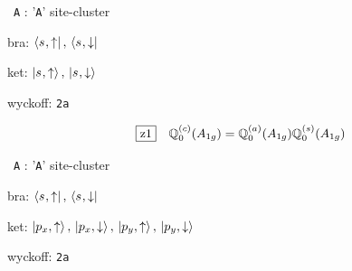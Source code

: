 \documentclass[fleqn,10pt,landscape]{jsarticle}
\begin{document}
\vspace{5mm}

\noindent\textbullet\, \texttt{A} : '\texttt{A}' site-cluster

\noindent\quad * bra: $\bra{s_{},\uparrow},\, \bra{s_{},\downarrow}$

\noindent\quad * ket: $\ket{s_{},\uparrow},\, \ket{s_{},\downarrow}$

\noindent\quad * wyckoff: \texttt{2a}

\begin{dmath*}
\hspace*{3mm}\fbox{z1}\quad \mathbb{Q}_{0}^{(c)}(A_{1g})=\mathbb{Q}_{0}^{(a)}(A_{1g}) \mathbb{Q}_{0}^{(s)}(A_{1g})
\end{dmath*}
\vspace{5mm}

\noindent\textbullet\, \texttt{A} : '\texttt{A}' site-cluster

\noindent\quad * bra: $\bra{s_{},\uparrow},\, \bra{s_{},\downarrow}$

\noindent\quad * ket: $\ket{p_{x},\uparrow},\, \ket{p_{x},\downarrow},\, \ket{p_{y},\uparrow},\, \ket{p_{y},\downarrow}$

\noindent\quad * wyckoff: \texttt{2a}
\end{document}
